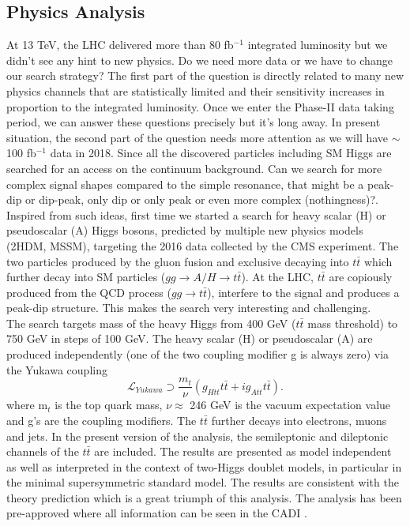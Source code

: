 \documentclass[12pt]{article}
\begin{document}
\subsection*{Physics Analysis}
At 13 TeV, the LHC delivered more than 80 fb$^{-1}$ integrated luminosity but we didn't see any hint to new physics. Do we need more data or we have to change our search strategy? The first part of the question is directly related to many new physics channels that are statistically limited and their sensitivity increases in proportion to the integrated luminosity. Once we enter the Phase-II data taking period, we can answer these questions precisely but it's long away. In present situation, the second part of the question needs more attention as we will have $\sim$100 fb$^{-1}$ data in 2018. Since all the discovered particles including SM Higgs are searched for an access on the continuum background. Can we search for more complex signal shapes compared to the simple resonance, that might be a peak-dip or dip-peak, only dip or only peak or even more complex (nothingness)?.\\
Inspired from such ideas, first time we started a search for heavy scalar (H) or pseudoscalar (A) Higgs bosons, predicted by multiple new physics models (2HDM, MSSM), targeting the 2016 data collected by the CMS experiment. The two particles produced by the gluon fusion and exclusive decaying into $t\bar t$ which further decay into SM particles ($gg\rightarrow A/H\rightarrow t\bar t$). At the LHC, $t\bar t$ are copiously produced from the QCD process ($gg\rightarrow t\bar t$), interfere to the signal and produces a peak-dip structure. This makes the search very interesting and challenging.\\
The search targets mass of the heavy Higgs from 400 GeV ($t\bar t$ mass threshold) to 750 GeV in steps of 100 GeV. The heavy scalar (H) or pseudoscalar (A) are produced independently (one of the two coupling modifier g is always zero) via the Yukawa coupling 
\begin{equation}
\mathcal{L}_{Yukawa} \supset \frac{m_{t}}{\nu}(g_{Htt} t\bar t + ig_{Att}t \bar t).
\end{equation}      
where m$_{t}$ is the top quark mass, $\nu\approx$ 246 GeV is the vacuum expectation value and g's are the coupling modifiers. The $t\bar t$ further decays into electrons, muons and jets. In the present version of the analysis, the semileptonic and dileptonic channels of the $t\bar t$ are included. The results are presented as model independent as well as interpreted in the context of two-Higgs doublet models, in particular in the minimal supersymmetric standard model. The results are consistent with the theory prediction which is a great triumph of this analysis. The analysis has been pre-approved where all information can be seen in the \textsc{CADI} \cite{first1}.\\
\end{document}
